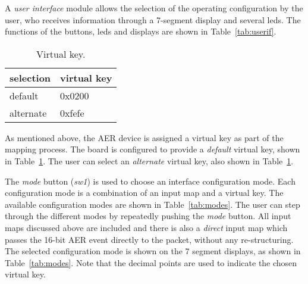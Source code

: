 A \emph{user interface} module allows the selection of the operating
configuration by the user, who receives information through a
7-segment display and several leds. The functions of the buttons, leds
and displays are shown in Table~\ref{tab:userif}.\\


\begin{table}[!hp]
\begin{center}
\begin{tabular}{| l | l |}
\hline
\multicolumn{1}{|c}{selection} & \multicolumn{1}{|c|}{virtual key} \\
\hline
default   &  0x0200 \\
alternate &  0xfefe \\
\hline
\end{tabular}
\caption{Virtual key.}
\label{tab:addrs}
\end{center}
\end{table}


As mentioned above, the AER device is assigned a virtual key as part
of the mapping process. The board is configured to provide
a \emph{default} virtual key, shown in Table~\ref{tab:addrs}. The user
can select an \emph{alternate} virtual key, also shown in
Table~\ref{tab:addrs}.

The \emph {mode} button (\emph{sw1}) is used to choose an interface
configuration mode. Each configuration mode is a combination of an
input map and a virtual key. The available configuration modes are
shown in Table~\ref{tab:modes}. The user can step through the
different modes by repeatedly pushing the \emph{mode} button. All
input maps discussed above are included and there is also
a \emph{direct} input map which passes the 16-bit AER event directly
to the packet, without any re-structuring. The selected configuration
mode is shown on the 7 segment displays, as shown in
Table~\ref{tab:modes}. Note that the decimal points are used to
indicate the chosen virtual key.



